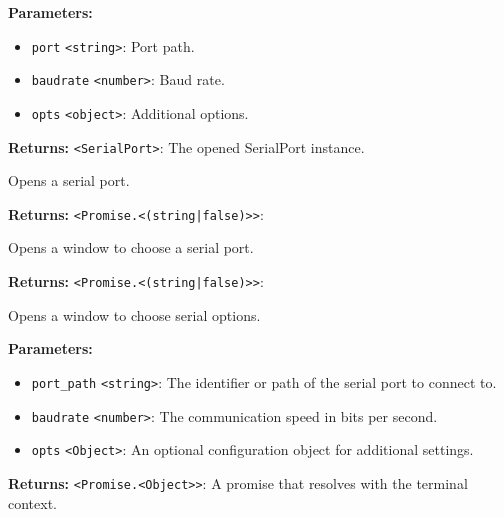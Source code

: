 \documentclass[12pt,a4paper]{article}
\begin{document}
\noindent \textbf{Parameters:}
\begin{itemize}
  \item \texttt{port} \texttt{<string>}: Port path.
  \item \texttt{baudrate} \texttt{<number>}: Baud rate.
  \item \texttt{opts} \texttt{<object>}: Additional options.
\end{itemize}

\noindent \textbf{Returns:} \texttt{<SerialPort>}: The opened SerialPort instance.

\noindent Opens a serial port.

\vspace{5mm}
\noindent {}


\noindent \textbf{Returns:} \texttt{<Promise.<(string|false)>>}: 

\noindent Opens a window to choose a serial port.

\vspace{5mm}
\noindent {}


\noindent \textbf{Returns:} \texttt{<Promise.<(string|false)>>}: 

\noindent Opens a window to choose serial options.

\vspace{5mm}
\noindent {}


\noindent \textbf{Parameters:}
\begin{itemize}
  \item \texttt{port\_path} \texttt{<string>}: The identifier or path of the serial port to connect to.
  \item \texttt{baudrate} \texttt{<number>}: The communication speed in bits per second.
  \item \texttt{opts} \texttt{<Object>}: An optional configuration object for additional settings.
\end{itemize}

\noindent \textbf{Returns:} \texttt{<Promise.<Object>>}: A promise that resolves with the terminal context.
\end{document}
